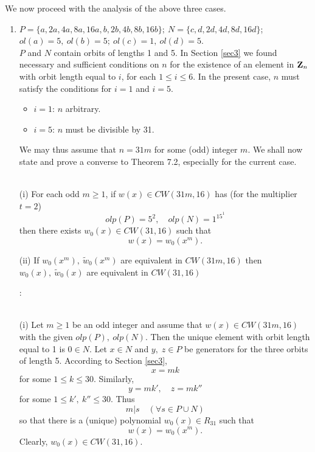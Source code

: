 {{{We now proceed with the analysis of the above three cases.
\begin{enumerate}
  \item  $ P=\{a,2a,4a,8a,16a,b,2b,4b,8b,16b\}; \  N=\{c,d,2d,4d,8d,16d\} $; \\ 
	 $ ol(a)=5, \ ol(b)=5; \  ol(c)=1, \  ol(d)=5 $.\\
	 
	 $P$ and $N$ contain orbits of lengths 1 and  5.
	 In Section \ref{sec3} we found necessary and sufficient conditions on 
	 $n$ for the existence of an element in ${\bf Z}_n$  
	 with orbit length equal to $i$, for each $1 \leq i \leq 6$.  
	 In the present case, $n$ must satisfy the conditions  for $i=1$ and 
	 $i=5$.  
	 \begin{itemize}
	     \item \underline{$i=1$}: $n$ arbitrary.
	     \item \underline{$i=5$}: $n$ must be divisible by 31.
	 \end{itemize}    
	 We may thus assume that $n=31m$ for some (odd) integer $m$. 
	 We shall now state and prove a converse to Theorem 7.2, especially for 
	 the current case.  

\begin{thm} \label{th1}
{ \ }\\
(i)    For each odd $m \geq1 $, if $w(x) \in CW(31m,16)$ has (for the 
       multiplier $t=2$)
		$$olp(P)=5^2, \quad olp(N)=1^15^1$$ 
	then there exists $w_0(x) \in CW(31,16)$ 
       such that 
		$$ w(x)=w_0(x^m).$$
	   
(ii)    If $w_0(x^m), \ \widetilde{w}_0(x^m)$ are equivalent in $CW(31m,16)$  
	then $w_0(x), \ \widetilde{w}_0(x)$ are equivalent in $CW(31,16)$  
\end{thm}
\begin{pr}:{\rm
{ \ }\\        

(i)     Let $m \geq 1$ be an odd integer and assume that $w(x) \in CW(31m,16)$ 
	with the given $olp(P), \ olp(N)$. 
	Then the unique element with orbit length equal to 1 is $0 \in N$. Let 
	$x \in N$ and $y, \; z \in P$ be generators for the three orbits of length 5. 
	According to Section \ref{sec3},
	  $$ x=mk $$
	for some $1 \leq k \leq 30$. Similarly, 
	       $$ y=mk', \quad z=mk'' $$
	for some $1 \leq k', \ k'' \leq 30$. 
Thus 
	$$ m | s \quad (\forall s \in P \cup N)$$
	 so that there is a (unique) polynomial $w_0(x) \in {R}_{31}$ 
	 such that 
	 $$ w(x)=w_0(x^{m}).$$
	 Clearly, $w_0(x) \in CW(31,16)$.
									    

}
\end{pr}
\end{enumerate}}}}
